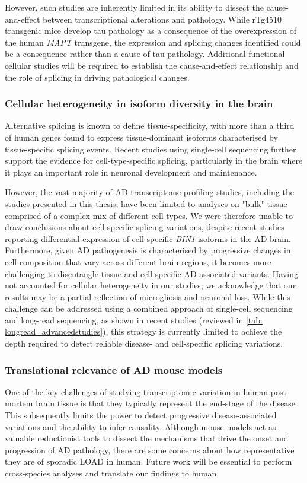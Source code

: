 However, such studies are inherently limited in its ability to dissect the cause-and-effect between transcriptional alterations and pathology. While rTg4510 transgenic mice develop tau pathology as a consequence of the overexpression of the human \textit{MAPT} transgene, the expression and splicing changes identified could be a consequence rather than a cause of tau pathology. Additional functional cellular studies will be required to establish the cause-and-effect relationship and the role of splicing in driving pathological changes. 

\subsubsection{Cellular heterogeneity in isoform diversity in the brain}
Alternative splicing is known to define tissue-specificity, with more than a third of human genes found to express tissue-dominant isoforms characterised by tissue-specific splicing events\cite{Wang2008,Yeo2004}. Recent studies using single-cell sequencing further support the evidence for cell-type-specific splicing, particularly in the brain where it plays an important role in neuronal development and maintenance.

However, the vast majority of AD transcriptome profiling studies, including the studies presented in this thesis, have been limited to analyses on "bulk" tissue comprised of a complex mix of different cell-types. We were therefore unable to draw conclusions about cell-specific splicing variations, despite recent studies reporting differential expression of cell-specific \textit{BIN1} isoforms in the AD brain\cite{Taga2020}. Furthermore, given AD pathogenesis is characterised by progressive changes in cell composition that vary across different brain regions, it becomes more challenging to disentangle tissue and cell-specific AD-associated variants. Having not accounted for cellular heterogeneity in our studies, we acknowledge that our results may be a partial reflection of microgliosis and neuronal loss. While this challenge can be addressed using a combined approach of single-cell sequencing and long-read sequencing, as shown in recent studies (reviewed in \cref{tab: longread_advancedstudies}), this strategy is currently limited to achieve the depth required to detect reliable disease- and cell-specific splicing variations. 

\subsubsection{Translational relevance of AD mouse models}
\label{ch7: rTg4510 relevance}
One of the key challenges of studying transcriptomic variation in human post-mortem brain tissue is that they typically represent the end-stage of the disease. This subsequently limits the power to detect progressive disease-associated variations and the ability to infer causality. Although mouse models act as valuable reductionist tools to dissect the mechanisms that drive the onset and progression of AD pathology, there are some concerns about how representative they are of sporadic LOAD in human. Future work will be essential to perform cross-species analyses and translate our findings to human.   


